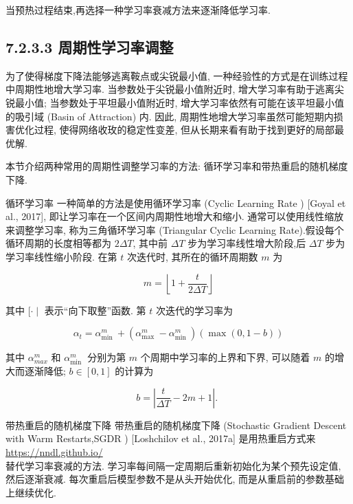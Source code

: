 \documentclass[10pt]{article}
\begin{document}
当预热过程结束,再选择一种学习率衰减方法来逐渐降低学习率.

\subsection*{7.2.3.3 周期性学习率调整}
为了使得梯度下降法能够逃离鞍点或尖锐最小值, 一种经验性的方式是在训练过程中周期性地增大学习率. 当参数处于尖锐最小值附近时, 增大学习率有助于逃离尖锐最小值; 当参数处于平坦最小值附近时, 增大学习率依然有可能在该平坦最小值的吸引域 (Basin of Attraction) 内. 因此, 周期性地增大学习率虽然可能短期内损害优化过程, 使得网络收玫的稳定性变差, 但从长期来看有助于找到更好的局部最优解.

本节介绍两种常用的周期性调整学习率的方法: 循环学习率和带热重启的随机梯度下降.

循环学习率 一种简单的方法是使用循环学习率 (Cyclic Learning Rate ) [Goyal et al., 2017], 即让学习率在一个区间内周期性地增大和缩小. 通常可以使用线性缩放来调整学习率, 称为三角循环学习率 (Triangular Cyclic Learning Rate).假设每个循环周期的长度相等都为 $2 \Delta T$, 其中前 $\Delta T$ 步为学习率线性增大阶段,后 $\Delta T$ 步为学习率线性缩小阶段. 在第 $t$ 次迭代时, 其所在的循环周期数 $m$ 为


\begin{equation*}
m=\left\lfloor 1+\frac{t}{2 \Delta T}\right\rfloor \tag{7.10}
\end{equation*}


其中 $[\cdot \mid$ 表示“向下取整”函数. 第 $t$ 次迭代的学习率为


\begin{equation*}
\alpha_{t}=\alpha_{\text {min }}^{m}+\left(\alpha_{\text {max }}^{m}-\alpha_{\text {min }}^{m}\right)(\max (0,1-b)) \tag{7.11}
\end{equation*}


其中 $\alpha_{m a x}^{m}$ 和 $\alpha_{\text {min }}^{m}$ 分别为第 $m$ 个周期中学习率的上界和下界, 可以随着 $m$ 的增大而逐渐降低; $b \in[0,1]$ 的计算为


\begin{equation*}
b=\left|\frac{t}{\Delta T}-2 m+1\right| \text {. } \tag{7.12}
\end{equation*}


带热重启的随机梯度下降 带热重启的随机梯度下降 (Stochastic Gradient Descent with Warm Restarts,SGDR ) [Loshchilov et al., 2017a] 是用热重启方式来 \href{https://nndl.github.io/}{https://nndl.github.io/}\\
替代学习率衰减的方法. 学习率每间隔一定周期后重新初始化为某个预先设定值, 然后逐渐衰减. 每次重启后模型参数不是从头开始优化, 而是从重启前的参数基础上继续优化.
\end{document}
